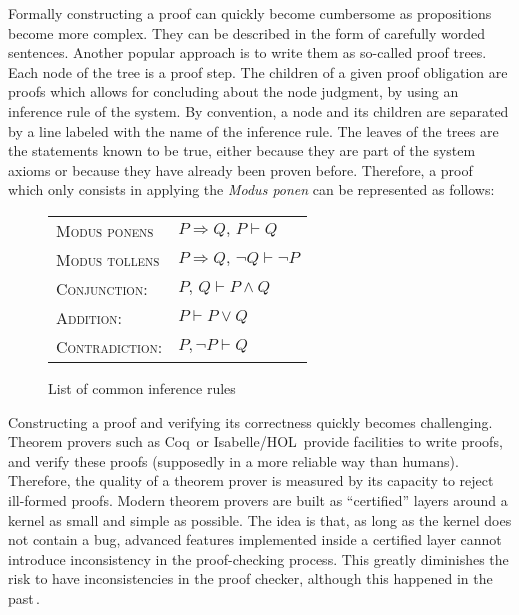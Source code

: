 Formally constructing a proof can quickly become cumbersome as propositions
become more complex.
%
They can be described in the form of carefully worded sentences.
%
Another popular approach is to write them as so-called proof trees.
%
Each node of the tree is a proof step.
%
The children of a given proof obligation are proofs which allows for concluding
about the node judgment, by using an inference rule of the system.
%
By convention, a node and its children are separated by a line labeled with the
name of the inference rule.
%
The leaves of the trees are the statements known to be true, either because they
are part of the system axioms or because they have already been proven before.
%
Therefore, a proof which only consists in applying the \emph{Modus ponen} can be
represented as follows:
%
\begin{prooftree}
     
\end{prooftree}

\begin{figure}
  \begin{center}
    \begin{tabular}{ll}
      {\scshape Modus ponens} & \( P \Rightarrow Q\text{, }P \vdash Q \) \\
      {\scshape Modus tollens} &
                                 \( P \Rightarrow Q\text{, }\neg Q \vdash \neg P \) \\
      {\scshape Conjunction:} & \( P\text{, }Q \vdash P \wedge Q \) \\
      {\scshape Addition:} & \( P \vdash P \vee Q \) \\
      {\scshape Contradiction:} & \( P, \neg P \vdash Q \)
    \end{tabular}
  \end{center}

  \caption{List of common inference rules}
  \label{fig:sota:inference}
\end{figure}

Constructing a proof and verifying its correctness quickly becomes challenging.
%
Theorem provers such as Coq\,\cite{coq} or
Isabelle/HOL\,\cite{nipkow2002isabelle} provide facilities to write proofs, and
verify these proofs (supposedly in a more reliable way than humans).
%
Therefore, the quality of a theorem prover is measured by its capacity to reject
ill-formed proofs.
%
Modern theorem provers are built as ``certified'' layers around a kernel as
small and simple as possible.
%
The idea is that, as long as the kernel does not contain a bug, advanced
features implemented inside a certified layer cannot introduce inconsistency in
the proof-checking process.
%
This greatly diminishes the risk to have inconsistencies in the proof checker,
although this happened in the
past\,\cite{claret2015falso,griffioen1998comparison}.

